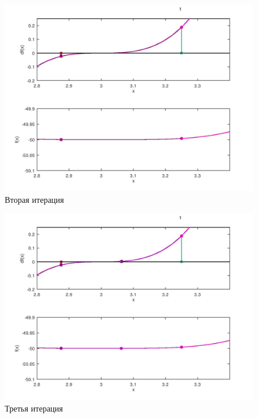 \documentclass[a4paper,12pt]{article}
\begin{document}
    \begin{figure}[H]
        \centering
        \includegraphics[scale=0.4]{2Bolcanoitter.jpg}
        \caption{Вторая итерация}
    \end{figure}
    \begin{figure}[H]
        \centering
        \includegraphics[scale=0.4]{3Bolcanoitter.jpg}
        \caption{Третья итерация}
    \end{figure} 
\newpage
\\
\end{document}
